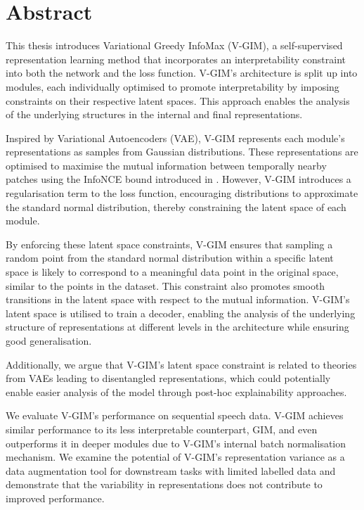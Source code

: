 \chapter*{ Abstract}
This thesis introduces Variational Greedy InfoMax (V-GIM), a self-supervised representation learning method that incorporates an interpretability constraint into both the network and the loss function. V-GIM's architecture is split up into modules, each individually optimised to promote interpretability by imposing constraints on their respective latent spaces. This approach enables the analysis of the underlying structures in the internal and final representations.

Inspired by Variational Autoencoders (VAE), V-GIM represents each module's representations as samples from Gaussian distributions. These representations are optimised to maximise the mutual information between temporally nearby patches using the InfoNCE bound introduced in \citep{oordRepresentationLearningContrastive2019}. However, V-GIM introduces a regularisation term to the loss function, encouraging distributions to approximate the standard normal distribution, thereby constraining the latent space of each module.


By enforcing these latent space constraints, V-GIM ensures that sampling a random point from the standard normal distribution within a specific latent space is likely to correspond to a meaningful data point in the original space, similar to the points in the dataset. This constraint also promotes smooth transitions in the latent space with respect to the mutual information. V-GIM's latent space is utilised to train a decoder, enabling the analysis of the underlying structure of representations at different levels in the architecture while ensuring good generalisation.

Additionally, we argue that V-GIM's latent space constraint is related to theories from VAEs leading to disentangled representations, which could potentially enable easier analysis of the model through post-hoc explainability approaches. 

We evaluate V-GIM's performance on sequential speech data. V-GIM achieves similar performance to its less interpretable counterpart, GIM, and even outperforms it in deeper modules due to V-GIM's internal batch normalisation mechanism. We examine the potential of V-GIM's representation variance as a data augmentation tool for downstream tasks with limited labelled data and demonstrate that the variability in representations does not contribute to improved performance.

